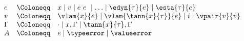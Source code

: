 {\flushleft
$\begin{array}{l c l}
  e & \Coloneqq & x \mid v \mid e~e~ \mid \ldots \mid \edyn{\tau}{e} \mid \esta{\tau}{e}
\\
  v & \Coloneqq & \vlam{x}{e} \mid \vlam{\tann{x}{\tau}}{e} \mid i \mid \vpair{v}{v}
\\
  \Gamma & \Coloneqq & \cdot \mid x,\Gamma \mid \tann{x}{\tau},\Gamma
\\
  A & \Coloneqq & e \mid \typeerror \mid \valueerror
\end{array}$

\medskip
\begin{minipage}{0.5\columnwidth}
\begin{mathpar}
\end{mathpar}
\end{minipage}%
\begin{minipage}{0.5\columnwidth}
\begin{mathpar}
\end{mathpar}
\end{minipage}

}
